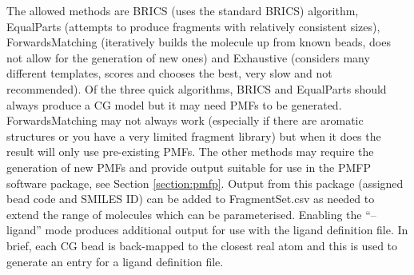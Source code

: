 \documentclass[10pt,a4paper,onecolumn]{report}
\begin{document}
The allowed methods are BRICS (uses the standard BRICS) algorithm, EqualParts (attempts to produce fragments with relatively consistent sizes), ForwardsMatching (iteratively builds the molecule up from known beads, does not allow for the generation of new ones) and Exhaustive (considers many different templates, scores and chooses the best, very slow and not recommended). Of the three quick algorithms, BRICS and EqualParts should always produce a CG model but it may need PMFs to be generated. ForwardsMatching may not always work (especially if there are aromatic structures or you have a very limited fragment library) but when it does the result will only use pre-existing PMFs. The other methods may require the generation of new PMFs and provide output suitable for use in the PMFP software package, see Section \ref{section:pmfp}. Output from this package (assigned bead code and SMILES ID) can be added to FragmentSet.csv as needed to extend the range of molecules which can be parameterised. Enabling the ``--ligand'' mode produces additional output for use with the ligand definition file. In brief, each CG bead is back-mapped to the closest real atom and this is used to generate an entry for a ligand definition file. 
 
\end{document}
